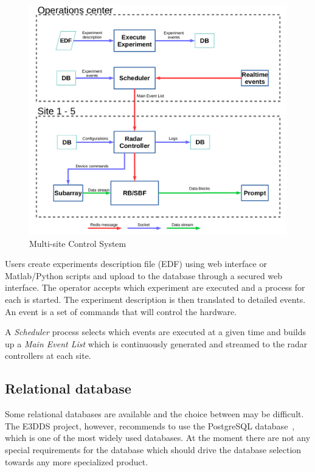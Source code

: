 \documentclass[12pt,a4paper]{article}
\begin{document}
\begin{figure}[h!]
\centering
\includegraphics[scale=0.4]{do2_figure2.png}
\caption{Multi-site Control System \label{fig-control-sys}}
\end{figure}

Users create experiments description file (EDF) using web interface or Matlab/Python scripts and upload to the \ED  database through a secured web interface. 
The operator accepts which experiment are executed and a process for each is started. 
The experiment description is then translated to detailed events. 
An event is a set of commands that will control the \ED hardware. 

A \emph{Scheduler} process selects which events are executed at a given time and builds up a {\emph{Main Event List}} which is continuously generated and streamed to the radar controllers at each site.  

\subsection{Relational database}

Some relational databases are available and the choice between may be difficult. 
The E3DDS project, however, recommends to use the PostgreSQL database~\cite{postgresql}, which is one of the most widely used databases. 
At the moment there are not any special requirements for the database which should drive the database selection towards any more specialized product.
\end{document}
